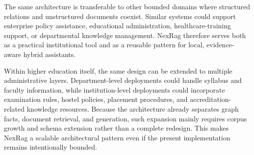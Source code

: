 The same architecture is transferable to other bounded domains where structured relations and unstructured documents coexist. Similar systems could support enterprise policy assistance, educational administration, healthcare-training support, or departmental knowledge management. NexRag therefore serves both as a practical institutional tool and as a reusable pattern for local, evidence-aware hybrid assistants.

Within higher education itself, the same design can be extended to multiple administrative layers. Department-level deployments could handle syllabus and faculty information, while institution-level deployments could incorporate examination rules, hostel policies, placement procedures, and accreditation-related knowledge resources. Because the architecture already separates graph facts, document retrieval, and generation, such expansion mainly requires corpus growth and schema extension rather than a complete redesign. This makes NexRag a scalable architectural pattern even if the present implementation remains intentionally bounded.
